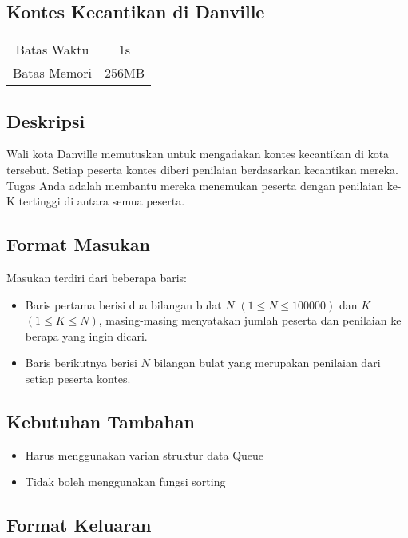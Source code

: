 \documentclass{article}
\begin{document}
\begin{center}
    \section*{Kontes Kecantikan di Danville}
    
    \begin{tabular}{ | c c | }
        \hline
        Batas Waktu  & 1s \\ 
        Batas Memori & 256MB \\ 
        \hline
    \end{tabular}
\end{center}

\subsection*{Deskripsi}

Wali kota Danville memutuskan untuk mengadakan kontes kecantikan di kota tersebut. Setiap peserta kontes diberi penilaian berdasarkan kecantikan mereka. Tugas Anda adalah membantu mereka menemukan peserta dengan penilaian ke-K tertinggi di antara semua peserta.

\subsection*{Format Masukan}

Masukan terdiri dari beberapa baris:
\begin{itemize}
    \item Baris pertama berisi dua bilangan bulat $N$ $(1 \leq N \leq 100000)$ dan $K$ $(1 \leq K \leq N)$, masing-masing menyatakan jumlah peserta dan penilaian ke berapa yang ingin dicari.
    \item Baris berikutnya berisi $N$ bilangan bulat yang merupakan penilaian dari setiap peserta kontes.
\end{itemize}

\subsection*{\textbf{Kebutuhan Tambahan}}
\begin{itemize}
    \item Harus menggunakan varian struktur data Queue
    \item Tidak boleh menggunakan fungsi sorting
\end{itemize}

\subsection*{Format Keluaran}
\end{document}

